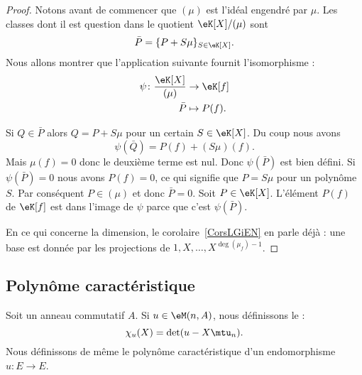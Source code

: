 \begin{proof}
	Notons avant de commencer que \( (\mu)\) est l'idéal engendré par \( \mu\). Les classes dont il est question dans le quotient \( \eK[X]/(\mu)\) sont
	\begin{equation}
		\bar P=\{ P+S\mu \}_{S\in \eK[X]}.
	\end{equation}
	Nous allons montrer que l'application suivante fournit l'isomorphisme :
	\begin{equation}
		\begin{aligned}
			\psi\colon \frac{ \eK[X] }{ (\mu) } & \to \eK[f]    \\
			\bar P                              & \mapsto P(f).
		\end{aligned}
	\end{equation}
	\begin{subproof}
		Si \( Q\in \bar P\) alors \( Q=P+S\mu\) pour un certain \( S\in \eK[X]\). Du coup nous avons
		\begin{equation}
			\psi(\bar Q)=P(f)+(S\mu)(f).
		\end{equation}
		Mais \( \mu(f)=0\) donc le deuxième terme est nul. Donc \( \psi(\bar P)\) est bien défini.
		\spitem[Injectif]
		Si \( \psi(\bar P)=0\) nous avons \( P(f)=0\), ce qui signifie que \( P=S\mu\) pour un polynôme \( S\). Par conséquent \( P\in (\mu)\) et donc \( \bar P=0\).
		\spitem[Surjectif]
		Soit \( P\in \eK[X]\). L'élément \( P(f) \) de \( \eK[f]\) est dans l'image de \( \psi\) parce que c'est \( \psi(\bar P)\).
	\end{subproof}
	En ce qui concerne la dimension, le corolaire~\ref{CorsLGiEN} en parle déjà : une base est donnée par les projections de \( 1,X,\ldots, X^{\deg(\mu_f)-1}\).
\end{proof}

\subsection{Polynôme caractéristique}

\begin{definition}  \label{DefOWQooXbybYD}
	Soit un anneau commutatif \( A\). Si \( u\in\eM(n,A)\), nous définissons le  :
	\begin{equation}    \label{Eqkxbdfu}
		\chi_u(X)=\det(u-X\mtu_n).
	\end{equation}
	Nous définissons de même le polynôme caractéristique d'un endomorphisme \( u\colon E\to E\).
\end{definition}

